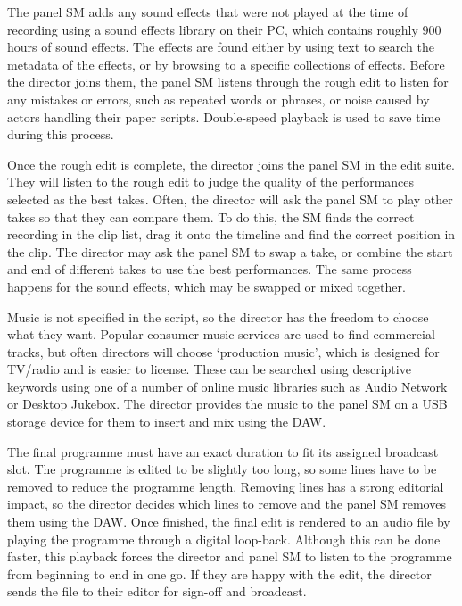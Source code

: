 The panel SM adds any sound effects that were not played at the time of recording using a sound effects library on
their PC, which contains roughly 900 hours of sound effects.  The effects are found either by using text to search the
metadata of the effects, or by browsing to a specific collections of effects.  Before the director joins them, the
panel SM listens through the rough edit to listen for any mistakes or errors, such as repeated words or phrases, or
noise caused by actors handling their paper scripts.  Double-speed playback is used to save time during this process.

Once the rough edit is complete, the director joins the panel SM in the edit suite. They will listen to the rough edit
to judge the quality of the performances selected as the best takes.  Often, the director will ask the panel SM to play
other takes so that they can compare them.  To do this, the SM finds the correct recording in the clip list, drag it
onto the timeline and find the correct position in the clip.  The director may ask the panel SM to swap a take, or
combine the start and end of different takes to use the best performances.  The same process happens for the sound
effects, which may be swapped or mixed together.

Music is not specified in the script, so the director has the freedom to choose what they want. Popular consumer music
services are used to find commercial tracks, but often directors will choose `production music', which is designed for
TV/radio and is easier to license. These can be searched using descriptive keywords using one of a number of online
music libraries such as Audio Network or Desktop Jukebox.  The director provides the music to the panel SM on a USB
storage device for them to insert and mix using the DAW.

The final programme must have an exact duration to fit its assigned broadcast slot. The programme is edited to be
slightly too long, so some lines have to be removed to reduce the programme length. Removing lines has a strong
editorial impact, so the director decides which lines to remove and the panel SM removes them using the DAW.  Once
finished, the final edit is rendered to an audio file by playing the programme through a digital loop-back. Although
this can be done faster, this playback forces the director and panel SM to listen to the programme from beginning to
end in one go. If they are happy with the edit, the director sends the file to their editor for sign-off and broadcast.

